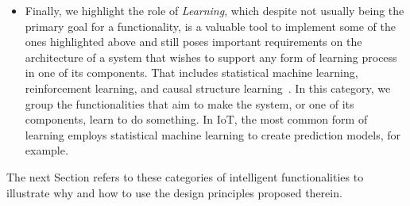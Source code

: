 \begin{itemize}
    \item Finally, we highlight the role of \emph{Learning}, which despite not usually being the primary goal for a functionality, is a valuable tool to implement some of the ones highlighted above and still poses important requirements on the architecture of a system that wishes to support any form of learning process in one of its components.
    That includes statistical machine learning, reinforcement learning, and causal structure learning~\cite{Bordini2020-AI,Erduran2023,Mariani2023a,Mariani2023}. 
    In this category, we group the functionalities that aim to make the system, or one of its components, learn to do something. 
    In IoT, the most common form of learning employs statistical machine learning to create prediction models, for example. 
\end{itemize}
%
The next Section refers to these categories of intelligent functionalities to illustrate why and how to use the design principles proposed therein.

